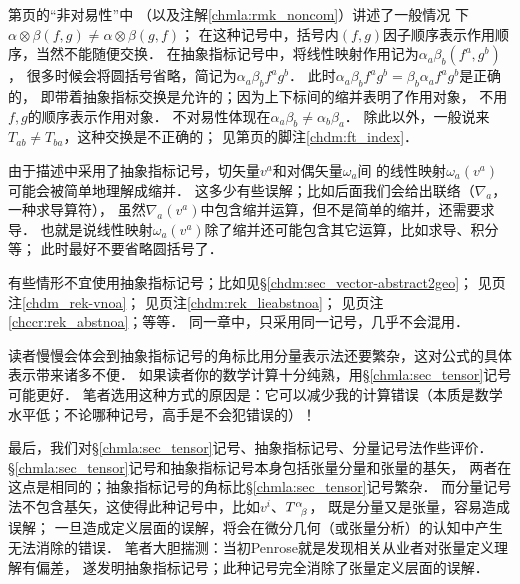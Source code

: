  第\pageref{chmla:sec_noncom}页的“非对易性”中
（以及注解\ref{chmla:rmk_noncom}）讲述了一般情况
下$\alpha \otimes \beta(f,g) \neq \alpha \otimes \beta(g,f)$；
在这种记号中，括号内$(f,g)$因子顺序表示作用顺序，当然不能随便交换．
在抽象指标记号中，将线性映射作用记为$\alpha _a \beta _b (f^a, g^b)$，
很多时候会将圆括号省略，简记为$\alpha _a \beta _b f^a g^b$．
此时$\alpha _a \beta _b f^a g^b=\beta_b \alpha_a f^a g^b$是正确的，
即带着抽象指标交换是允许的；因为上下标间的缩并表明了作用对象，
不用$f,g$的顺序表示作用对象．
不对易性体现在$\alpha _a \beta _b \neq \alpha_b \beta_a$．
除此以外，一般说来$T_{ab}\neq T_{ba}$，这种交换是不正确的；
见第\pageref{chdm:ft_index}页的脚注\ref{chdm:ft_index}．

 由于描述中采用了抽象指标记号，切矢量$v^a$和对偶矢量$\omega_a$间
的线性映射$\omega_a(v^a)$可能会被简单地理解成缩并．
这多少有些误解；比如后面我们会给出联络（$\nabla_a$，一种求导算符），
虽然$\nabla_a (v^a)$中包含缩并运算，但不是简单的缩并，还需要求导．
也就是说线性映射$\omega_a(v^a)$除了缩并还可能包含其它运算，比如求导、积分等；
此时最好不要省略圆括号了．


  有些情形不宜使用抽象指标记号；比如见\S \ref{chdm:sec_vector-abstract2geo}；
见\pageref{chdm_rek-vnoa}页注\ref{chdm_rek-vnoa}；
见\pageref{chdm:rek_lieabstnoa}页注\ref{chdm:rek_lieabstnoa}；
见\pageref{chccr:rek_abstnoa}页注\ref{chccr:rek_abstnoa}；等等．
同一章中，只采用同一记号，几乎不会混用．




读者慢慢会体会到抽象指标记号的角标比用分量表示法还要繁杂，这对公式的具体表示带来诸多不便．
如果读者你的数学计算十分纯熟，用\S\ref{chmla:sec_tensor}记号可能更好．
笔者选用这种方式的原因是：它可以减少我的计算错误（本质是数学水平低；不论哪种记号，高手是不会犯错误的）！




最后，我们对\S\ref{chmla:sec_tensor}记号、抽象指标记号、分量记号法作些评价．
\S\ref{chmla:sec_tensor}记号和抽象指标记号本身包括张量分量和张量的基矢，
两者在这点是相同的；抽象指标记号的角标比\S\ref{chmla:sec_tensor}记号繁杂．
而分量记号法不包含基矢，这使得此种记号中，比如$v^i$、$T^\alpha_{\hphantom{\alpha}\beta}$，
既是分量又是张量，容易造成误解；
一旦造成定义层面的误解，将会在微分几何（或张量分析）的认知中产生无法消除的错误．
笔者大胆揣测：当初Penrose就是发现相关从业者对张量定义理解有偏差，
遂发明抽象指标记号；此种记号完全消除了张量定义层面的误解．


